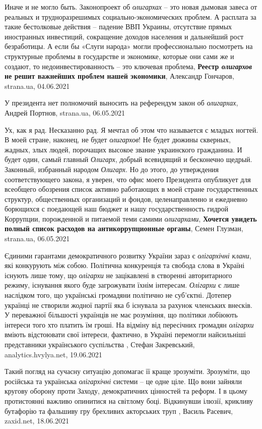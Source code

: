 Иначе и не могло быть. Законопроект об \emph{олигархах} – это новая дымовая
завеса от реальных и трудноразрешимых социально-экономических проблем. А
расплата за такие бестолковые действия – падение ВВП Украины, отсутствие прямых
иностранных инвестиций, сокращение доходов населения и дальнейший рост
безработицы. А если бы «Слуги народа» могли профессионально посмотреть на
структурные проблемы в государстве и экономике, которые они сами же и создают,
то недоинвестированность – это ключевая проблема,
\textbf{Реестр \emph{олигархов} не решит важнейших проблем нашей экономики},
Александр Гончаров, strana.ua, 04.06.2021

У президента нет полномочий выносить на референдум закон об \emph{олигархах},
Андрей Портнов, strana.ua, 06.05.2021

Ух, как я рад. Несказанно рад. Я мечтал об этом что называется с младых ногтей.
В моей стране, наконец, не будет \emph{олигархов}! Не будет дюжины скверных, жадных,
злых людей, порочащих высокое звание украинского гражданина. И будет один,
самый главный \emph{Олигарх}, добрый всевидящий и бесконечно щедрый. Законный,
избранный народом \emph{Олигарх}.  Но до этого, до утверждения соответствующего
закона, я уверен, что офис моего Президента опубликует для всеобщего обозрения
список активно работающих в моей стране государственных структур, общественных
организаций и фондов, целенаправленно и ежедневно борющихся с поедающей наш
бюджет и нашу государственность гидрой Коррупции, порожденной и питаемой теми
самими \emph{олигархами},
\textbf{Хочется увидеть полный список расходов на антикоррупционные органы},
Семен Глузман, strana.ua, 06.05.2021


Єдиними гарантами демократичного розвитку України зараз є \emph{олігархічні клани},
які конкурують між собою. Політична конкуренція та свобода слова в Україні
існують лише тому, що \emph{олігархи} не зацікавлені в створенні авторитарного
режиму, існування якого буде загрожувати їхнім інтересам. \emph{Олігархи} є лише
наслідком того, що українські громадяни політично не суб’єктні. Дотепер
українці не створили жодної партії яка б існувала за рахунок членських
внесків. У переважної більшості українців не має розуміння, що політики
лобіюють інтереси того хто платить їм гроші. На відміну від пересічних
громадян \emph{олігархи} вміють відстоювати свої інтереси, фактично, в Україні
перемогли найсильніші представники українського суспільства
, Стефан Закревський, 
analytics.hvylya.net, 19.06.2021

Такий погляд на сучасну ситуацію допомагає її краще зрозуміти. Зрозуміти, що
російська та українська \emph{олігархічні} системи – це одне ціле. Що вони зайняли
кругову оборону проти Заходу, демократичних цінностей та реформ. І в цьому
протистоянні важливо опинитися на світлому боці. Відкинувши ілюзії, крикливу
бутафорію та фальшиву гру брехливих акторських труп
, 
Василь Расевич, zaxid.net, 18.06.2021


